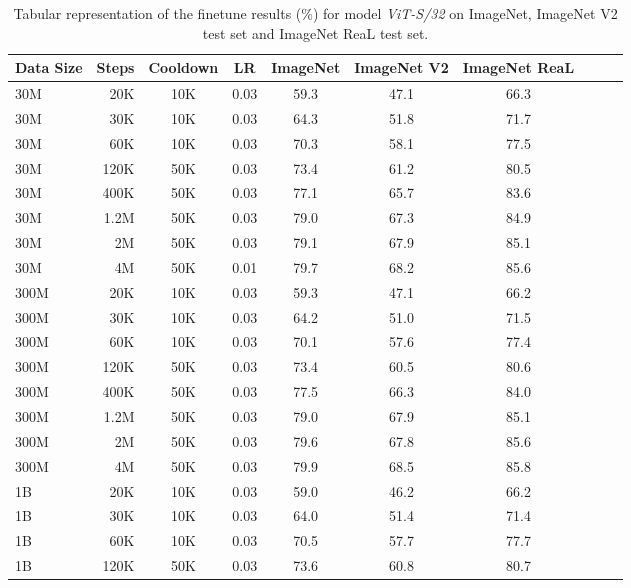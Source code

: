 \begin{table}[h]
  \setlength{\tabcolsep}{5pt}
  \setlength{\extrarowheight}{5pt}
  \renewcommand{\arraystretch}{0.75}
  \centering
  \caption{Tabular representation of the finetune results (\%) for model \emph{ViT-S/32} on ImageNet, ImageNet V2 test set and ImageNet ReaL test set.}\label{tbl:s_32_ft}
  \begin{tabulary}{1.0\textwidth}{l r c c c c c c c c}
    \toprule[1pt]
    \bf{Data Size} & \bf{Steps} & \bf{Cooldown} & \bf{LR} & \bf{ImageNet} & \bf{ImageNet V2} & \bf{ImageNet ReaL} \\
    \midrule
30M   & 20K   & 10K   & 0.03 & 59.3 & 47.1 & 66.3 \\
30M   & 30K   & 10K   & 0.03 & 64.3 & 51.8 & 71.7 \\
30M   & 60K   & 10K   & 0.03 & 70.3 & 58.1 & 77.5 \\
30M   & 120K  & 50K   & 0.03 & 73.4 & 61.2 & 80.5 \\
30M   & 400K  & 50K   & 0.03 & 77.1 & 65.7 & 83.6 \\
30M   & 1.2M  & 50K   & 0.03 & 79.0 & 67.3 & 84.9 \\
30M   & 2M    & 50K   & 0.03 & 79.1 & 67.9 & 85.1 \\
30M   & 4M    & 50K   & 0.01 & 79.7 & 68.2 & 85.6 \\
\midrule[0.25pt]
300M  & 20K   & 10K   & 0.03 & 59.3 & 47.1 & 66.2 \\
300M  & 30K   & 10K   & 0.03 & 64.2 & 51.0 & 71.5 \\
300M  & 60K   & 10K   & 0.03 & 70.1 & 57.6 & 77.4 \\
300M  & 120K  & 50K   & 0.03 & 73.4 & 60.5 & 80.6 \\
300M  & 400K  & 50K   & 0.03 & 77.5 & 66.3 & 84.0 \\
300M  & 1.2M  & 50K   & 0.03 & 79.0 & 67.9 & 85.1 \\
300M  & 2M    & 50K   & 0.03 & 79.6 & 67.8 & 85.6 \\
300M  & 4M    & 50K   & 0.03 & 79.9 & 68.5 & 85.8 \\
\midrule[0.25pt]
1B    & 20K   & 10K   & 0.03 & 59.0 & 46.2 & 66.2 \\
1B    & 30K   & 10K   & 0.03 & 64.0 & 51.4 & 71.4 \\
1B    & 60K   & 10K   & 0.03 & 70.5 & 57.7 & 77.7 \\
1B    & 120K  & 50K   & 0.03 & 73.6 & 60.8 & 80.7 \\

\end{tabulary}
\end{table}
